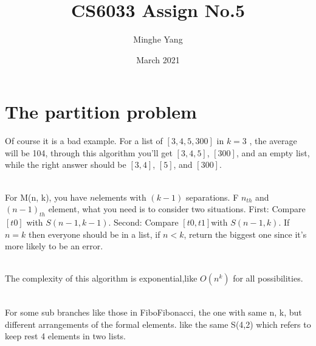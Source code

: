 \documentclass{article}
\title{CS6033 Assign No.5}
\author{Minghe Yang}
\date{March 2021}
\begin{document}
\renewcommand{\algorithmicrequire}{\textbf{Input:}} 
\renewcommand{\algorithmicensure}{\textbf{Output:}}
\maketitle

\section{The partition problem}
Of course it is a bad example.
For a list of $[3, 4, 5, 300]$ in $k = 3$ , the average will be 104, through this algorithm you'll get $[3, 4, 5]$, $[300]$, and an empty list, while the right answer should be $[3, 4]$, $[5]$, and $[300]$.
\\\\
For M(n, k), you have $n$elements with $(k-1)$ separations. F $n_{th}$ and $(n-1)_{th}$ element, what you need is to consider two situations.
First: Compare $[t0]$ with $S(n-1, k-1)$. Second: Compare $[t0, t1] $with $S(n-1, k)$.
If $n = k$ then everyone should be in a list, if $n < k$, return the biggest one since it's more likely to be an error. 
\\\\
The complexity of this algorithm is exponential,like $O(n^k)$ for all possibilities.
\\\\
For some sub branches like those in FiboFibonacci, the one with same n, k, but different arrangements of the formal elements. like the same S(4,2) which refers to keep rest 4 elements in two lists.
\\\\
\clearpage
{}
\end{document}
